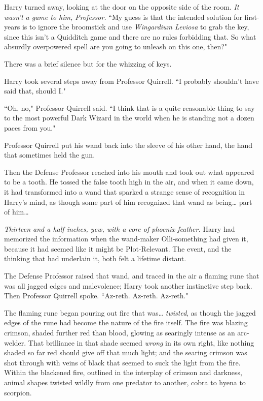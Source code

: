 Harry turned away, looking at the door on the opposite side of the room. \emph{It wasn't a game to him, Professor.} ``My guess is that the intended solution for first-years is to ignore the broomstick and use \emph{Wingardium Leviosa} to grab the key, since this isn't a Quidditch game and there are no rules forbidding that. So what absurdly overpowered spell are you going to unleash on this one, then?"

There was a brief silence but for the whizzing of keys.

Harry took several steps away from Professor Quirrell. ``I probably shouldn't have said that, should I."

``Oh, no," Professor Quirrell said. ``I think that is a quite reasonable thing to say to the most powerful Dark Wizard in the world when he is standing not a dozen paces from you."

Professor Quirrell put his wand back into the sleeve of his other hand, the hand that sometimes held the gun.

Then the Defense Professor reached into his mouth and took out what appeared to be a tooth. He tossed the false tooth high in the air, and when it came down, it had transformed into a wand that sparked a strange sense of recognition in Harry's mind, as though some part of him recognized that wand as being{\ldots} part of him{\ldots}

\emph{Thirteen and a half inches, yew, with a core of phoenix feather.} Harry had memorized the information when the wand-maker Olli-something had given it, because it had seemed like it might be Plot-Relevant. The event, and the thinking that had underlain it, both felt a lifetime distant.

The Defense Professor raised that wand, and traced in the air a flaming rune that was all jagged edges and malevolence; Harry took another instinctive step back. Then Professor Quirrell spoke. ``Az-reth. Az-reth. Az-reth."

The flaming rune began pouring out fire that was{\ldots} \emph{twisted}, as though the jagged edges of the rune had become the nature of the fire itself. The fire was blazing crimson, shaded further red than blood, glowing as searingly intense as an arc-welder. That brilliance in that shade seemed \emph{wrong} in its own right, like nothing shaded so far red should give off that much light; and the searing crimson was shot through with veins of black that seemed to suck the light from the fire. Within the blackened fire, outlined in the interplay of crimson and darkness, animal shapes twisted wildly from one predator to another, cobra to hyena to scorpion.

